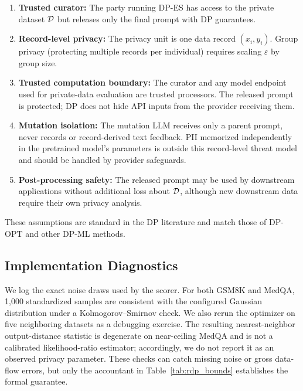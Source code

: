 \begin{enumerate}
    \item \textbf{Trusted curator:} The party running DP-ES has access to the private dataset $\mathcal{D}$ but releases only the final prompt with DP guarantees.

    \item \textbf{Record-level privacy:} The privacy unit is one data record $(x_i, y_i)$. Group privacy (protecting multiple records per individual) requires scaling $\varepsilon$ by group size.

    \item \textbf{Trusted computation boundary:} The curator and any model endpoint used for private-data evaluation are trusted processors. The released prompt is protected; DP does not hide API inputs from the provider receiving them.

    \item \textbf{Mutation isolation:} The mutation LLM receives only a parent prompt, never records or record-derived text feedback. PII memorized independently in the pretrained model's parameters is outside this record-level threat model and should be handled by provider safeguards.

    \item \textbf{Post-processing safety:} The released prompt may be used by downstream applications without additional loss about $\mathcal{D}$, although new downstream data require their own privacy analysis.
\end{enumerate}

These assumptions are standard in the DP literature and match those of DP-OPT and other DP-ML methods.

\subsection{Implementation Diagnostics}

We log the exact noise draws used by the scorer. For both GSM8K and MedQA, 1,000 standardized samples are consistent with the configured Gaussian distribution under a Kolmogorov--Smirnov check. We also rerun the optimizer on five neighboring datasets as a debugging exercise. The resulting nearest-neighbor output-distance statistic is degenerate on near-ceiling MedQA and is not a calibrated likelihood-ratio estimator; accordingly, we do not report it as an observed privacy parameter. These checks can catch missing noise or gross data-flow errors, but only the accountant in Table~\ref{tab:rdp_bounds} establishes the formal guarantee.


